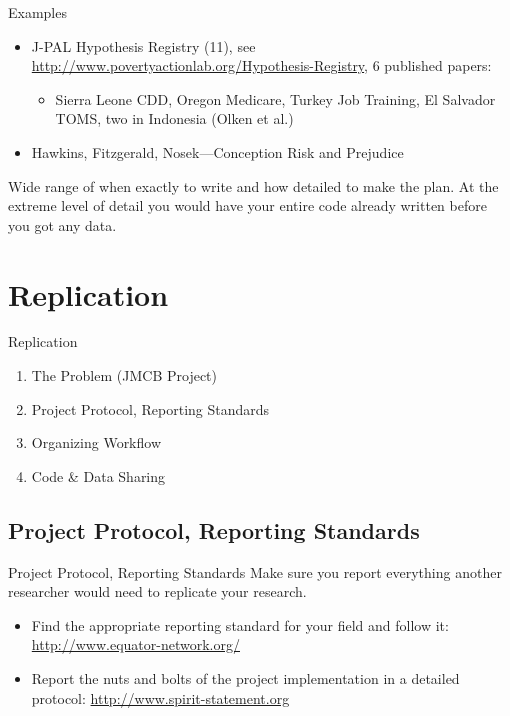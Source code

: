 \documentclass{beamer}
\begin{document}
\begin{frame}{Examples}

\begin{itemize}[<.->]
\item
J-PAL Hypothesis Registry (11), see \url{http://www.povertyactionlab.org/Hypothesis-Registry}, 6 published papers:
\begin{itemize}
\item
 Sierra Leone CDD, Oregon Medicare, Turkey Job Training, El Salvador TOMS, two in Indonesia (Olken et al.)
\end{itemize}
\item Hawkins, Fitzgerald, Nosek---Conception Risk and Prejudice
\end{itemize} 
\vspace{0.25in}
Wide range of when exactly to write and how detailed to make the plan. At the extreme level of detail you would have your entire code already written before you got any data.
\end{frame}

\section{Replication}
\begin{frame}{Replication}
\begin{enumerate}[<.->]
 \item The Problem	(JMCB Project)
 \item Project Protocol, Reporting Standards
 \item Organizing Workflow
 \item Code \& Data Sharing
\end{enumerate}
\end{frame}

\subsection*{Project Protocol, Reporting Standards}
\begin{frame}[<.->]{Project Protocol, Reporting Standards}
 Make sure you report everything another researcher would need to replicate your research.
 \begin{itemize}
 \item Find the appropriate reporting standard for your field and follow it: \url{http://www.equator-network.org/}
\item Report the nuts and bolts of the project implementation in a detailed protocol: \url{http://www.spirit-statement.org}
\end{itemize}
\end{frame}
\end{document}
